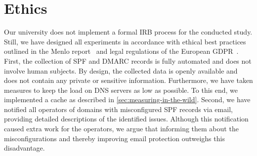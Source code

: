 \appendix

\section{Ethics}
\label{app:ethics}
Our university does not implement a formal IRB process for the conducted study. Still, we have designed all experiments in accordance with ethical best practices outlined in the Menlo report~\citep{KenDit12} and legal regulations of the European GDPR~\citep{GDPR}. First, the collection of SPF and DMARC records is fully automated and does not involve human subjects. By design, the collected data is openly available and does not contain any private or sensitive information. Furthermore, we have taken measures to keep the load on DNS servers as low as possible.
To this end, we implemented a cache as described in \autoref{sec:measuring-in-the-wild}.
Second, we have notified all operators of domains with misconfigured SPF records via email, providing detailed descriptions of the identified issues.
Although this notification caused extra work for the operators, we argue that informing them about the misconfigurations and thereby improving email protection outweighs this disadvantage.


